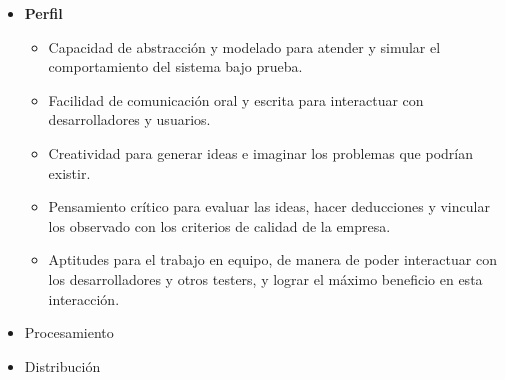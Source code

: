 \begin{itemize}
\begin{itemize}
            \item \textbf{Perfil}
            \begin{itemize}
				\item Capacidad de abstracción y modelado para atender y simular el comportamiento del sistema bajo prueba.
                \item Facilidad de comunicación oral y escrita para interactuar con desarrolladores y usuarios.
                \item Creatividad para generar ideas e imaginar los problemas que podrían existir.
                \item Pensamiento crítico para evaluar las ideas, hacer deducciones y vincular los observado con los criterios de calidad de la empresa.
                \item Aptitudes para el trabajo en equipo, de manera de poder interactuar con los desarrolladores y otros testers, y lograr el máximo beneficio en esta interacción.
            \end{itemize}
            
           \item Procesamiento
           \item Distribución
          \end{itemize}
            \end{itemize}          
            
            
